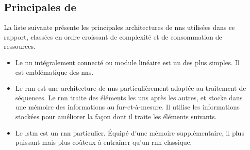 \subsection{Principales  de }
\label{def:lstm} \label{def:rnn}

La liste suivante présente les principales \glspl{architecture} de \glspl{nn} utilisées dans ce rapport, classées en ordre croissant de complexité et de consommation de ressources.

\begin{itemize}
	\item Le \gls{nn} intégralement connecté ou module linéaire est un des  plus simples. Il est emblématique des \glspl{nn}.
	
	\item Le \gls{rnn} est une \gls{architecture} de \glspl{nn} particulièrement adaptée au traitement de séquences. Le \gls{rnn} traite des éléments les uns après les autres, et stocke dans une \og mémoire \fg{} des informations au fur-et-à-mesure. Il utilise les informations stockées pour améliorer la façon dont il traite les éléments suivants. 
	
	\item Le \gls{lstm} est un \gls{rnn} particulier. Équipé d'une mémoire supplémentaire, il plus puissant mais plus coûteux à entraîner qu'un \gls{rnn} classique.
\end{itemize}


%
%

